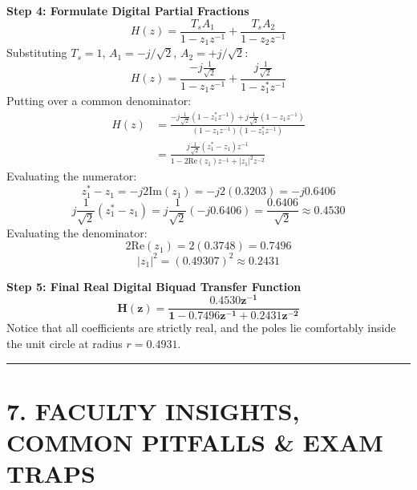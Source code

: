 \documentclass[11pt,a4paper]{article}
\begin{document}
\noindent\textbf{Step 4: Formulate Digital Partial Fractions}
\begin{equation}
H(z) = \frac{T_s A_1}{1 - z_1 z^{-1}} + \frac{T_s A_2}{1 - z_2 z^{-1}}
\end{equation}
Substituting $T_s = 1$, $A_1 = -j/\sqrt{2}$, $A_2 = +j/\sqrt{2}$:
\begin{equation}
H(z) = \frac{-j \frac{1}{\sqrt{2}}}{1 - z_1 z^{-1}} + \frac{j \frac{1}{\sqrt{2}}}{1 - z_1^* z^{-1}}
\end{equation}
Putting over a common denominator:
\begin{align}
H(z) &= \frac{-j \frac{1}{\sqrt{2}}(1 - z_1^* z^{-1}) + j \frac{1}{\sqrt{2}}(1 - z_1 z^{-1})}{(1 - z_1 z^{-1})(1 - z_1^* z^{-1})} \nonumber \\
     &= \frac{j \frac{1}{\sqrt{2}}(z_1^* - z_1) z^{-1}}{1 - 2\text{Re}(z_1) z^{-1} + |z_1|^2 z^{-2}}
\end{align}
Evaluating the numerator:
\begin{equation}
z_1^* - z_1 = -j 2\text{Im}(z_1) = -j 2(0.3203) = -j 0.6406
\end{equation}
\begin{equation}
j \frac{1}{\sqrt{2}}(z_1^* - z_1) = j \frac{1}{\sqrt{2}}(-j 0.6406) = \frac{0.6406}{\sqrt{2}} \approx \mathbf{0.4530}
\end{equation}
Evaluating the denominator:
\begin{equation}
2\text{Re}(z_1) = 2(0.3748) = \mathbf{0.7496}
\end{equation}
\begin{equation}
|z_1|^2 = (0.49307)^2 \approx \mathbf{0.2431}
\end{equation}

\noindent\textbf{Step 5: Final Real Digital Biquad Transfer Function}
\begin{equation}
\mathbf{H(z) = \frac{0.4530 z^{-1}}{1 - 0.7496 z^{-1} + 0.2431 z^{-2}}}
\end{equation}
Notice that all coefficients are strictly real, and the poles lie comfortably inside the unit circle at radius $r = 0.4931$.

\noindent\rule{\textwidth}{0.5pt}

\section{7. FACULTY INSIGHTS, COMMON PITFALLS \& EXAM TRAPS}
\end{document}
